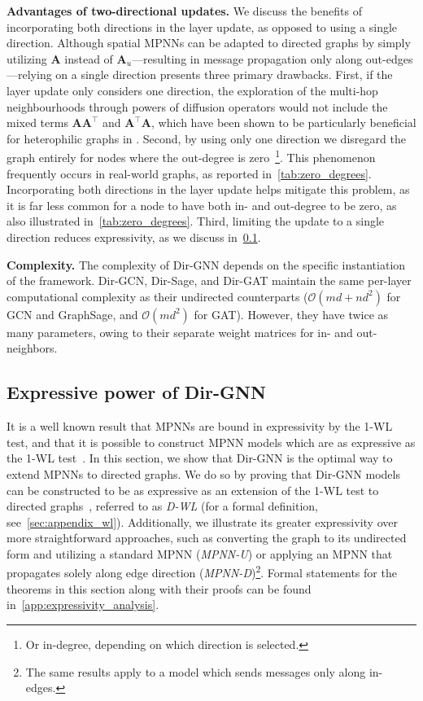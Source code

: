 \documentclass{article}
\newcommand\oursacro{Dir-GNN}
\theoremstyle{plain}
\theoremstyle{definition}
\theoremstyle{remark}
\begin{document}
\textbf{Advantages of two-directional updates.} We discuss the benefits of incorporating both directions in the layer update, as opposed to using a single direction. Although spatial MPNNs can be adapted to directed graphs by simply utilizing $\mathbf{A}$ instead of $\mathbf{A}_u$—resulting in message propagation only along out-edges—relying on a single direction presents three primary drawbacks. 
First, if the layer update only considers one direction, the exploration of the multi-hop neighbourhoods through powers of diffusion operators would not include the mixed terms $\mathbf{A}\mathbf{A}^\top$ and $\mathbf{A}^\top\mathbf{A}$, which have been shown to be particularly beneficial for heterophilic graphs in .
Second, by using only one direction we disregard the graph entirely for nodes where the out-degree is zero~\footnote{Or in-degree, depending on which direction is selected.}. This phenomenon frequently occurs in real-world graphs, as reported in~\cref{tab:zero_degrees}. Incorporating both directions in the layer update helps mitigate this problem, as it is far less common for a node to have both in- and out-degree to be zero, as also illustrated in~\cref{tab:zero_degrees}.
Third, limiting the update to a single direction reduces expressivity, as we discuss in~\cref{sec:expressivity}.

\textbf{Complexity.}
The complexity of \oursacro{} depends on the specific instantiation of the framework. Dir-GCN, Dir-Sage, and Dir-GAT maintain the same per-layer computational complexity as their undirected counterparts ($\mathcal{O}(md + nd^2)$ for GCN and GraphSage, and $\mathcal{O}(md^2)$ for GAT). However, they have twice as many parameters, owing to their separate weight matrices for in- and out-neighbors.

\subsection{Expressive power of \oursacro{}} \label{sec:expressivity}
It is a well known result that MPNNs are bound in expressivity by the 1-WL test, and that it is possible to construct MPNN models which are as expressive as the 1-WL test~\cite{DBLP:conf/iclr/XuHLJ19}. In this section, we show that \oursacro{} is the optimal way to extend MPNNs to directed graphs. We do so by proving that \oursacro{} models can be constructed to be as expressive as an extension of the 1-WL test to directed graphs~\cite{Grohe2021ColorRA}, referred to as \textit{D-WL} (for a formal definition, see~\cref{sec:appendix_wl}). Additionally, we illustrate its greater expressivity over more straightforward approaches, such as converting the graph to its undirected form and utilizing a standard MPNN (\textit{MPNN-U}) or applying an MPNN that propagates solely along edge direction (\textit{MPNN-D})\footnote{The same results apply to a model which sends messages only along in-edges.}. Formal statements for the theorems in this section along with their proofs can be found in~\cref{app:expressivity_analysis}. 
\end{document}

